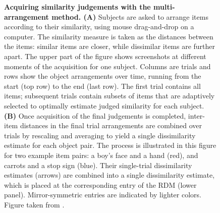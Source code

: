 \documentclass[
  authoryear]{elsarticle}
\begin{document}
\begin{figure}


\caption{\label{fig-multi-arrangement}\textbf{Acquiring similarity
judgements with the multi-arrangement method. (A)} Subjects are asked to
arrange items according to their similarity, using mouse drag-and-drop
on a computer. The similarity measure is taken as the distances between
the items: similar items are closer, while dissimilar items are further
apart. The upper part of the figure shows screenshots at different
moments of the acquisition for one subject. Columns are trials and rows
show the object arrangements over time, running from the start (top row)
to the end (last row). The first trial contains all items; subsequent
trials contain subsets of items that are adaptively selected to
optimally estimate judged similarity for each subject. \textbf{(B)} Once
acquisition of the final judgements is completed, inter-item distances
in the final trial arrangements are combined over trials by rescaling
and averaging to yield a single dissimilarity estimate for each object
pair. The process is illustrated in this figure for two example item
pairs: a boy's face and a hand (red), and carrots and a stop sign
(blue). Their single-trial dissimilarity estimates (arrows) are combined
into a single dissimilarity estimate, which is placed at the
corresponding entry of the RDM (lower panel). Mirror-symmetric entries
are indicated by lighter colors. Figure taken from
\citet{murHumanObjectSimilarityJudgments2013}.}


\end{figure}
\end{document}
